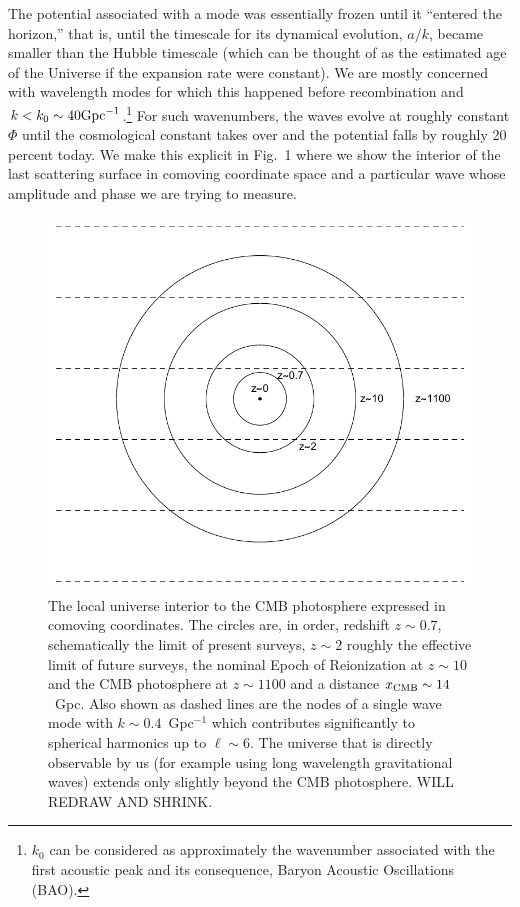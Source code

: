 \documentclass[psfig,11pt]{article}
\begin{document}
The potential associated with a mode was essentially frozen until it ``entered the horizon,'' that is, until the timescale for its dynamical evolution, $a/k$, became smaller than the Hubble timescale (which can be thought of as the estimated age of the Universe if the expansion rate were constant).
   We are mostly concerned with wavelength modes for which this happened before recombination and $k<k_0\sim40{\rm Gpc}^{-1}$.\footnote{$k_0$ can be considered as approximately the wavenumber associated with the first acoustic peak and its consequence, Baryon Acoustic Oscillations (BAO).} For such wavenumbers, the waves evolve at roughly constant $\Phi$ until the cosmological constant takes over and the potential falls by roughly 20 percent today. We make this explicit in Fig.~1 where we show the interior of the last scattering surface in comoving coordinate space and a particular wave whose amplitude and phase we are trying to measure.
\begin{figure}[t]
\centering
\includegraphics{nsffig.pdf}
\caption{The local universe interior to the CMB photosphere expressed in comoving coordinates. The circles are, in order, redshift $z\sim0.7$, schematically the limit of present surveys, $z\sim2$ roughly the effective limit of future surveys, the nominal Epoch of Reionization at $z\sim10$ and the CMB photosphere at $z\sim1100$ and a distance $x_{\rm CMB}\sim14$~Gpc. Also shown as dashed lines are the nodes of a single wave mode with $k\sim0.4$~Gpc$^{-1}$ which contributes significantly to spherical harmonics up to $\ell\sim6$. The universe that is directly observable by us (for example using long wavelength gravitational waves) extends only slightly beyond the CMB photosphere. WILL REDRAW AND SHRINK.}
\end{figure}
\end{document}
